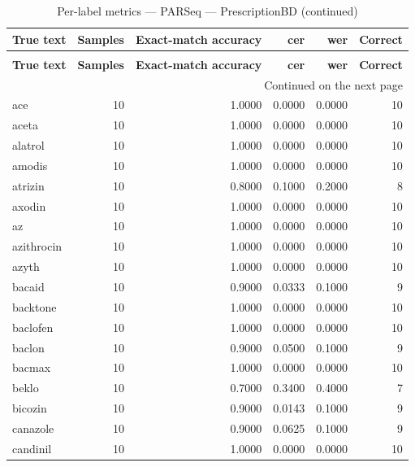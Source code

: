 \begingroup
\setlength{\tabcolsep}{2.5pt}
\renewcommand{\arraystretch}{1.05}
\sloppy
\scriptsize
\begin{longtable}{p{3.0cm}rrrrr}
\caption{Per-label metrics — PARSeq — PrescriptionBD}\label{tab:e4-01_parseq_evaluation-per-label}\\
\toprule
\textbf{True text} & \textbf{Samples} & \textbf{Exact-match accuracy} & \textbf{cer} & \textbf{wer} & \textbf{Correct} \\
\midrule
\endfirsthead
\caption*{Per-label metrics — PARSeq — PrescriptionBD (continued)}\\
\toprule
\textbf{True text} & \textbf{Samples} & \textbf{Exact-match accuracy} & \textbf{cer} & \textbf{wer} & \textbf{Correct} \\
\midrule
\endhead
\midrule
\multicolumn{6}{r}{Continued on the next page}\\
\endfoot
\bottomrule
\endlastfoot
ace & 10 & 1.0000 & 0.0000 & 0.0000 & 10 \\
aceta & 10 & 1.0000 & 0.0000 & 0.0000 & 10 \\
alatrol & 10 & 1.0000 & 0.0000 & 0.0000 & 10 \\
amodis & 10 & 1.0000 & 0.0000 & 0.0000 & 10 \\
atrizin & 10 & 0.8000 & 0.1000 & 0.2000 & 8 \\
axodin & 10 & 1.0000 & 0.0000 & 0.0000 & 10 \\
az & 10 & 1.0000 & 0.0000 & 0.0000 & 10 \\
azithrocin & 10 & 1.0000 & 0.0000 & 0.0000 & 10 \\
azyth & 10 & 1.0000 & 0.0000 & 0.0000 & 10 \\
bacaid & 10 & 0.9000 & 0.0333 & 0.1000 & 9 \\
backtone & 10 & 1.0000 & 0.0000 & 0.0000 & 10 \\
baclofen & 10 & 1.0000 & 0.0000 & 0.0000 & 10 \\
baclon & 10 & 0.9000 & 0.0500 & 0.1000 & 9 \\
bacmax & 10 & 1.0000 & 0.0000 & 0.0000 & 10 \\
beklo & 10 & 0.7000 & 0.3400 & 0.4000 & 7 \\
bicozin & 10 & 0.9000 & 0.0143 & 0.1000 & 9 \\
canazole & 10 & 0.9000 & 0.0625 & 0.1000 & 9 \\
candinil & 10 & 1.0000 & 0.0000 & 0.0000 & 10 \\

\end{longtable}
